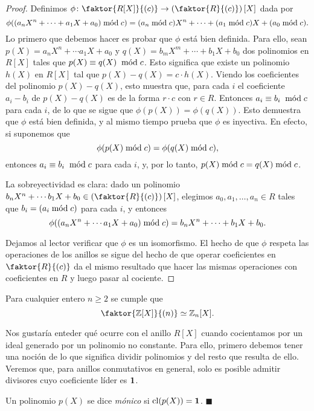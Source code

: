 \begin{proof}
Definimos $\phi\colon \faktor{R[X]}{(c)} \rightarrow \left( \faktor{R}{(c)} \right)[X]$ dada por
$$\phi((a_nX^n + \cdots + a_1X + a_0) \minimodu c) = (a_n \minimodu c)X^n + \cdots + (a_1 \minimodu c)X + (a_0 \minimodu c).$$
Lo primero que debemos hacer es probar que $\phi$ está bien definida. Para ello, sean $p(X) = a_nX^n + \cdots a_1X + a_0$ y $q(X) = b_mX^m + \cdots + b_1X + b_0$ dos polinomios en $R[X]$ tales que $p(X) \equiv q(X) \modu c$. Esto significa que existe un polinomio $h(X)$ en $R[X]$ tal que $p(X) - q(X) = c \cdot h(X)$. Viendo los coeficientes del polinomio $p(X)- q(X)$, esto muestra que, para cada $i$ el coeficiente $a_i - b_i$ de $p(X)-q(X)$ es de la forma $r \cdot c$ con $r \in R$. Entonces $a_i \equiv b_i \modu c$ para cada $i$, de lo que se sigue que $\phi(p(X)) = \phi(q(X))$. Esto demuestra que $\phi$ está bien definida, y al mismo tiempo prueba que $\phi$ es inyectiva. En efecto, si suponemos que $$\phi(p(X) \minimodu c) = \phi(q(X) \minimodu c),$$ entonces $a_i \equiv b_i \modu c$ para cada $i$, y, por lo tanto, $p(X) \minimodu c = q(X) \minimodu c$.

La sobreyectividad es clara: dado un polinomio $b_nX^n + \cdots b_1X + b_0 \in \left( \faktor{R}{(c)} \right)[X]$, elegimos $a_0, a_1, \dots, a_n \in R$ tales que $b_i = (a_i \minimodu c)$ para cada $i$, y entonces
$$\phi((a_nX^n + \cdots a_1X+a_0) \minimodu c) = b_nX^n + \cdots + b_1X+b_0.$$

Dejamos al lector verificar que $\phi$ es un isomorfismo. El hecho de que $\phi$ respeta las operaciones de los anillos se sigue del hecho de que operar coeficientes en $\faktor{R}{(c)}$ da el mismo resultado que hacer las mismas operaciones con coeficientes en $R$ y luego pasar al cociente.
\end{proof}

\begin{corollary} 
Para cualquier entero $n \geq 2$ se cumple que
$$\faktor{\mathbb{Z}[X]}{(n)} \simeq \mathbb{Z}_n[X].$$
\end{corollary}

Nos gustaría enteder qué ocurre con el anillo $R[X]$ cuando cocientamos por un ideal generado por un polinomio no constante. Para ello, primero debemos tener una noción de lo que significa dividir polinomios y del resto que resulta de ello. Veremos que, para anillos conmutativos en general, solo es posible admitir divisores cuyo coeficiente líder es $\1$.

\begin{definition}
Un polinomio $p(X)$ se dice \emph{mónico} si $\mathrm{cl}(p(X)) = \1$. \hfill$\blacksquare$
\end{definition}

